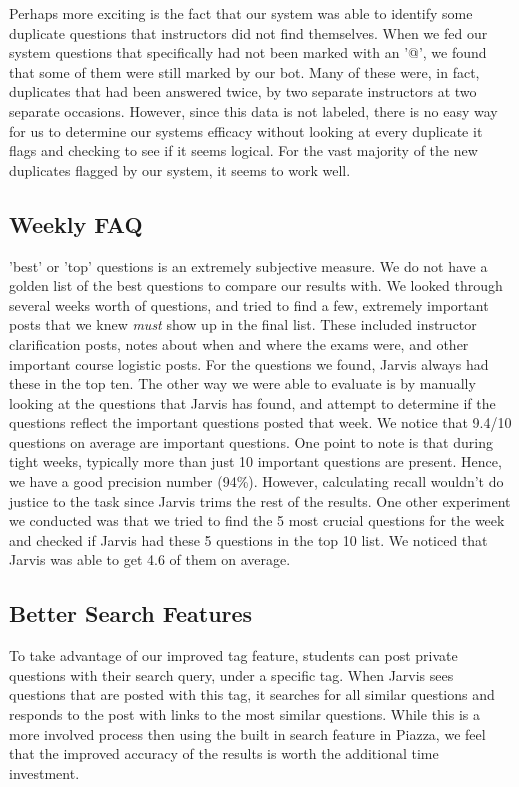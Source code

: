 \documentclass[sigconf]{acmart}
\begin{document}
Perhaps more exciting is the fact that our system was able to identify some duplicate questions that instructors did not find themselves. When we fed our system questions that specifically had not been marked with an '@', we found that some of them were still marked by our bot. Many of these were, in fact, duplicates that had been answered twice, by two separate instructors at two separate occasions. However, since this data is not labeled, there is no easy way for us to determine our systems efficacy without looking at every duplicate it flags and checking to see if it seems logical. For the vast majority of the new duplicates flagged by our system, it seems to work well.

\subsection{Weekly FAQ}

'best' or 'top' questions is an extremely subjective measure. We do not have a golden list of the best questions to compare our results with. We looked through several weeks worth of questions, and tried to find a few, extremely important posts that we knew \textit{must} show up in the final list. These included instructor clarification posts, notes about when and where the exams were, and other important course logistic posts. For the questions we found, Jarvis always had these in the top ten. The other way we were able to evaluate is by manually looking at the questions that Jarvis has found, and attempt to determine if the questions reflect the important questions posted that week. We notice that 9.4/10 questions on average are important questions. One point to note is that during tight weeks, typically more than just 10 important questions are present. Hence, we have a good precision number (94\%). However, calculating recall wouldn't do justice to the task since Jarvis trims the rest of the results. One other experiment we conducted was that we tried to find the 5 most crucial questions for the week and checked if Jarvis had these 5 questions in the top 10 list. We noticed that Jarvis was able to get 4.6 of them on average.

\subsection{Better Search Features}
To take advantage of our improved tag feature, students can post private questions with their search query, under a specific tag. When Jarvis sees questions that are posted with this tag, it searches for all similar questions and responds to the post with links to the most similar questions. While this is a more involved process then using the built in search feature in Piazza, we feel that the improved accuracy of the results is worth the additional time investment.
\end{document}
